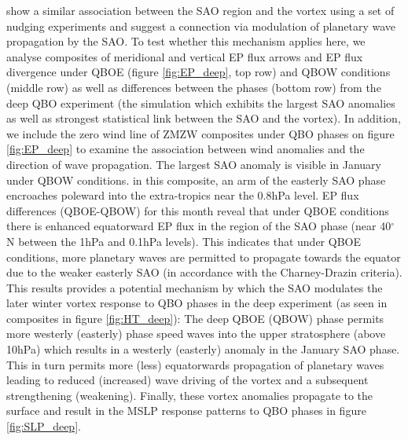 \cite{grayForecasting2020a} show a similar association between the SAO region and the vortex using a set of nudging experiments and suggest a connection via modulation of planetary wave propagation by the SAO. To test whether this mechanism applies here, we analyse composites of meridional and vertical EP flux arrows and EP flux divergence under QBOE (figure \ref{fig:EP_deep}, top row) and QBOW conditions (middle row) as well as differences between the phases (bottom row) from the deep QBO experiment (the simulation which exhibits the largest SAO anomalies as well as strongest statistical link between the SAO and the vortex). In addition, we include the zero wind line of ZMZW composites under QBO phases on figure \ref{fig:EP_deep} to examine the association between wind anomalies and the direction of wave propagation. The largest SAO anomaly is visible in January under QBOW conditions. in this composite, an arm of the easterly SAO phase encroaches poleward into the extra-tropics near the 0.8hPa level. EP flux differences (QBOE-QBOW) for this month reveal that under QBOE conditions there is enhanced equatorward EP flux in the region of the SAO phase (near 40$^\circ$N between the 1hPa and 0.1hPa levels). This indicates that under QBOE conditions, more planetary waves are permitted to propagate towards the equator due to the weaker easterly SAO (in accordance with the Charney-Drazin criteria). This results provides a potential mechanism by which the SAO modulates the later winter vortex response to QBO phases in the deep experiment (as seen in composites in figure \ref{fig:HT_deep}): The deep QBOE (QBOW) phase permits more westerly (easterly) phase speed waves into the upper stratosphere (above 10hPa) which results in a westerly (easterly) anomaly in the January SAO phase. This in turn permits more (less) equatorwards propagation of planetary waves leading to reduced (increased) wave driving of the vortex and a subsequent strengthening (weakening). Finally, these vortex anomalies propagate to the surface and result in the MSLP response patterns to QBO phases in figure \ref{fig:SLP_deep}.

